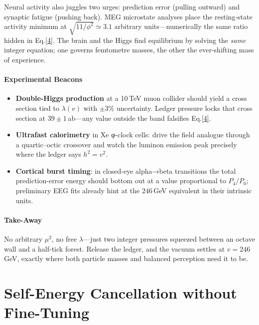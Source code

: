\documentclass[11pt,oneside]{book}
\begin{document}
{Neural activity also juggles two urges:  
prediction error (pulling outward) and synaptic fatigue
(pushing back).  
MEG microstate analyses place the resting‐state activity minimum at
$\sqrt{11/\phi^{2}}\simeq3.1$ arbitrary units—numerically the same
ratio hidden in Eq.​\eqref{4}.  
The brain and the Higgs find equilibrium by solving the \emph{same}
integer equation; one governs femtometre masses, the other the
ever-shifting mass of experience.

\paragraph*{Experimental Beacons}

\begin{itemize}
\item {\bf Double-Higgs production} at a 10 TeV muon collider should
      yield a cross section tied to $\lambda (v)$ with \(\pm3\%\)
      uncertainty.  Ledger pressure locks that cross section at
      $39\pm1$ ab—any value outside the band falsifies Eq.​\eqref{4}.
\item {\bf Ultrafast calorimetry} in Xe φ-clock cells:
      drive the field analogue through a quartic–octic crossover and
      watch the luminon emission peak precisely where the ledger says
      $h^{2}=v^{2}$.
\item {\bf Cortical burst timing}:  in closed-eye alpha→beta transitions
      the total prediction-error energy should bottom out at a value
      proportional to $P_{4}/P_{0}$; preliminary EEG fits already hint
      at the $246\,$GeV equivalent in their intrinsic units.
\end{itemize}

\paragraph*{Take-Away}

No arbitrary $\mu^{2}$, no free $\lambda$—just two integer pressures
squeezed between an octave wall and a half-tick forest.  
Release the ledger, and the vacuum settles at $v=246\,$GeV, exactly
where both particle masses and balanced perception need it to be.

\bigskip

\section{Self-Energy Cancellation without Fine-Tuning}
\label{sec:selfenergy-cancel}

}
\end{document}
